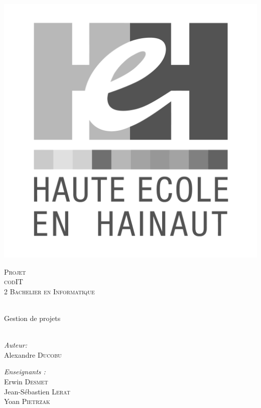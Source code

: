 \begin{center}
  \includegraphics[scale=0.12]{textures/logo/heh_bw.pdf}

  \vspace{1cm}

  \textsc{\LARGE Projet} \\ [0.5cm]
  \textsc{\Large codIT} \\ [0.5cm]

  \textsc{\large 2 Bachelier en Informatique} \\ [0.2cm]

  \begingroup
   \selectfont 

  \HRule \\ [0.4cm] {
    \huge Gestion de projets \\ [0.2cm] 
  }
  \HRule \\ [1.3cm]
  \endgroup
  \begin{minipage}[t]{0.4 \textwidth} 
    \begin{flushleft} 
      \large \emph{Auteur:} \\ 
      Alexandre \textsc{Ducobu}
    \end{flushleft} 
  \end{minipage}
  \begin{minipage}[t]{0.4 \textwidth}
    \begin{flushright} 
      \large \emph{Enseignants :} \\ 
      Erwin \textsc{Desmet} \\
      Jean-Sébastien \textsc{Lerat} \\
      Yoan \textsc{Pietrzak}
    \end{flushright} 
  \end{minipage}


\end{center}
